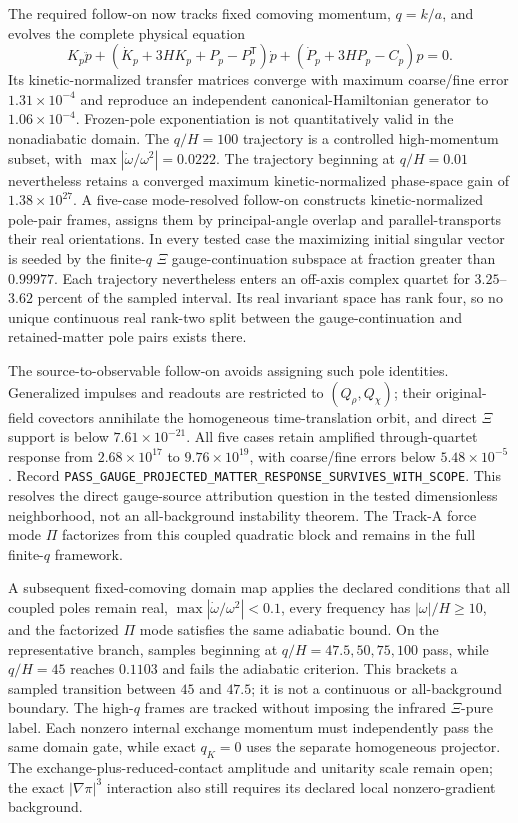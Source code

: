The required follow-on now tracks fixed comoving momentum, $q=k/a$, and
evolves the complete physical equation
\begin{equation}
 K_p\ddot p+
 \left(\dot K_p+3HK_p+P_p-P_p^{\mathsf T}\right)\dot p+
 \left(\dot P_p+3HP_p-C_p\right)p=0.
 \label{eq:fixed-comoving-transfer}
\end{equation}
Its kinetic-normalized transfer matrices converge with maximum coarse/fine
error $1.31\times10^{-4}$ and reproduce an independent canonical-Hamiltonian
generator to $1.06\times10^{-4}$.  Frozen-pole exponentiation is not
quantitatively valid in the nonadiabatic domain.  The $q/H=100$ trajectory is
a controlled high-momentum subset, with
$\max|\dot\omega/\omega^2|=0.0222$.  The trajectory beginning at $q/H=0.01$
nevertheless retains a converged maximum kinetic-normalized phase-space gain
of $1.38\times10^{27}$.  A five-case mode-resolved follow-on constructs
kinetic-normalized pole-pair frames, assigns them by principal-angle overlap
and parallel-transports their real orientations.  In every tested case the
maximizing initial singular vector is seeded by the finite-$q$ $\Xi$
gauge-continuation subspace at fraction greater than $0.99977$.  Each
trajectory nevertheless enters an off-axis complex quartet for
$3.25$--$3.62$ percent of the sampled interval.  Its real invariant space has
rank four, so no unique continuous real rank-two split between the
gauge-continuation and retained-matter pole pairs exists there.

The source-to-observable follow-on avoids assigning such pole identities.
Generalized impulses and readouts are restricted to $(Q_\rho,Q_\chi)$; their
original-field covectors annihilate the homogeneous time-translation orbit,
and direct $\Xi$ support is below $7.61\times10^{-21}$.  All five cases retain
amplified through-quartet response from $2.68\times10^{17}$ to
$9.76\times10^{19}$, with coarse/fine errors below $5.48\times10^{-5}$.
Record
\texttt{PASS\_GAUGE\_PROJECTED\_MATTER\_RESPONSE\_SURVIVES\_WITH\_SCOPE}.
This resolves the direct gauge-source attribution question in the tested
dimensionless neighborhood, not an all-background instability theorem.  The
Track-A force mode $\Pi$ factorizes from this coupled quadratic block and
remains in the full finite-$q$ framework.

A subsequent fixed-comoving domain map applies the declared conditions that
all coupled poles remain real, $\max|\dot\omega/\omega^2|<0.1$, every
frequency has $|\omega|/H\geq10$, and the factorized $\Pi$ mode satisfies the
same adiabatic bound.  On the representative branch, samples beginning at
$q/H=47.5,50,75,100$ pass, while $q/H=45$ reaches $0.1103$ and fails the
adiabatic criterion.  This brackets a sampled transition between $45$ and
$47.5$; it is not a continuous or all-background boundary.  The high-$q$
frames are tracked without imposing the infrared $\Xi$-pure label.  Each
nonzero internal exchange momentum must independently pass the same domain
gate, while exact $q_K=0$ uses the separate homogeneous projector.
The exchange-plus-reduced-contact amplitude and unitarity scale remain open;
the exact $|\nabla\pi|^3$ interaction also still requires its declared local
nonzero-gradient background.


